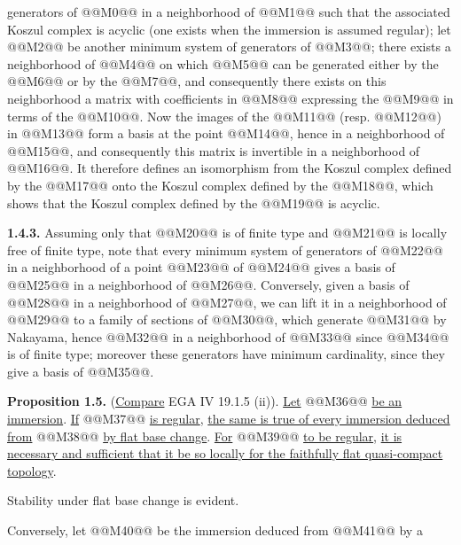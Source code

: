 generators of @@M0@@ in a neighborhood of @@M1@@ such that the associated Koszul complex is acyclic (one exists when the immersion is assumed regular); let @@M2@@ be another minimum system of generators of @@M3@@; there exists a neighborhood of @@M4@@ on which @@M5@@ can be generated either by the @@M6@@ or by the @@M7@@, and consequently there exists on this neighborhood a matrix with coefficients in @@M8@@ expressing the @@M9@@ in terms of the @@M10@@. Now the images of the @@M11@@ (resp. @@M12@@) in @@M13@@ form a basis at the point @@M14@@, hence in a neighborhood of @@M15@@, and consequently this matrix is invertible in a neighborhood of @@M16@@. It therefore defines an isomorphism from the Koszul complex defined by the @@M17@@ onto the Koszul complex defined by the @@M18@@, which shows that the Koszul complex defined by the @@M19@@ is acyclic.

\textbf{1.4.3.} Assuming only that @@M20@@ is of finite type and @@M21@@ is locally free of finite type, note that every minimum system of generators of @@M22@@ in a neighborhood of a point @@M23@@ of @@M24@@ gives a basis of @@M25@@ in a neighborhood of @@M26@@. Conversely, given a basis of @@M28@@ in a neighborhood of @@M27@@, we can lift it in a neighborhood of @@M29@@ to a family of sections of @@M30@@, which generate @@M31@@ by Nakayama, hence @@M32@@ in a neighborhood of @@M33@@ since @@M34@@ is of finite type; moreover these generators have minimum cardinality, since they give a basis of @@M35@@.

\textbf{Proposition 1.5.} (\uline{Compare} EGA IV 19.1.5 (ii)). \uline{Let} @@M36@@ \uline{be an immersion}. \uline{If} @@M37@@ \uline{is regular}, \uline{the same is true of every immersion deduced from} @@M38@@ \uline{by flat base change}. \uline{For} @@M39@@ \uline{to be regular}, \uline{it is necessary and sufficient that it be so locally for the faithfully flat quasi-compact topology}.

Stability under flat base change is evident.

Conversely, let @@M40@@ be the immersion deduced from @@M41@@ by a
